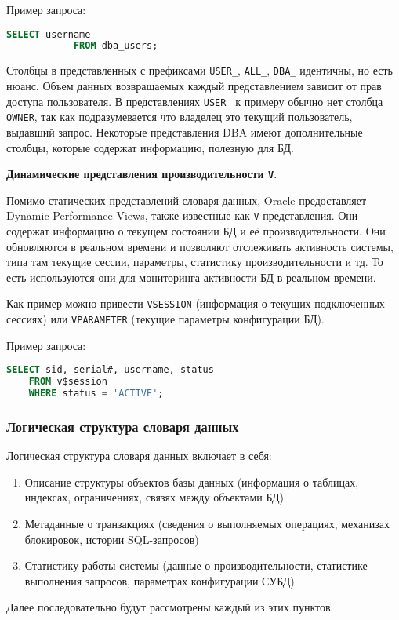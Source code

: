 \begin{enumerate}
\begin{enumerate}
        Пример запроса:
        \begin{lstlisting}[language=SQL]
            SELECT username 
            FROM dba_users;
        \end{lstlisting}

    \end{enumerate}

    Столбцы в представленных с префиксами \texttt{USER\_}, \texttt{ALL\_}, \texttt{DBA\_} идентичны, но есть нюанс. Объем данных возвращаемых каждый представлением зависит от прав доступа пользователя. В представлениях \texttt{USER\_} к примеру обычно нет столбца \texttt{OWNER}, так как подразумевается что владелец это текущий пользователь, выдавший запрос. Некоторые представления DBA имеют дополнительные столбцы, которые содержат информацию, полезную для БД.

    \textbf{Динамические представления производительности \texttt{V\textdollar}}. \autocite{oracledbdoc2}

    Помимо статических представлений словаря данных, Oracle предоставляет Dynamic Performance Views, также известные как \texttt{V\textdollar}-представления. Они содержат информацию о текущем состоянии БД и её производительности. Они обновляются в реальном времени и позволяют отслеживать активность системы, типа там текущие сессии, параметры, статистику производительности и тд. То есть используются они для мониторинга активности БД в реальном времени.

    Как пример можно привести \texttt{V\textdollar SESSION} (информация о текущих подключенных сессиях) или \texttt{V\textdollar PARAMETER} (текущие параметры конфигурации БД).

    Пример запроса:
    \begin{lstlisting}[language=SQL]
    SELECT sid, serial#, username, status 
    FROM v$session 
    WHERE status = 'ACTIVE';
    \end{lstlisting}
    
\end{enumerate}

\subsubsection{Логическая структура словаря данных}

Логическая структура словаря данных \autocite{PostgreSQLdocc51,ElmasriNavathe,Silberschatz} включает в себя:

\begin{enumerate}
    \item Описание структуры объектов базы данных (информация о таблицах, индексах, ограничениях, связях между объектами БД)
    \item Метаданные о транзакциях (сведения о выполняемых операциях, механизах блокировок, истории SQL-запросов)
    \item Статистику работы системы (данные о производительности, статистике выполнения запросов, параметрах конфигурации СУБД)
\end{enumerate}
Далее последовательно будут рассмотрены каждый из этих пунктов.

